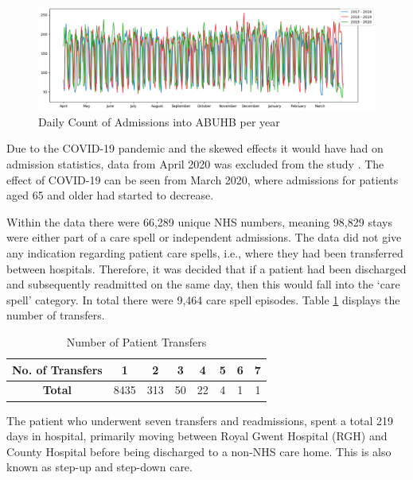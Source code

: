 \documentclass[../thesis.tex]{subfiles}
\begin{document}
\begin{figure}[h!]
    \centering
    \includegraphics[width=\textwidth]{Chapters/Chapter5/Figures/Admission each year.png}
    \caption{Daily Count of Admissions into ABUHB per year}
    \label{fig:AdmissionCount}
\end{figure}

Due to the COVID-19 pandemic and the skewed effects it would have had on admission statistics, data from April 2020 was excluded from the study \cite{Venkatesan2020}. The effect of COVID-19 can be seen from March 2020, where admissions for patients aged 65 and older had started to decrease.

Within the data there were 66,289 unique NHS numbers, meaning 98,829 stays were either part of a care spell or independent admissions. The data did not give any indication regarding patient care spells, i.e., where they had been transferred between hospitals. Therefore, it was decided that if a patient had been discharged and subsequently readmitted on the same day, then this would fall into the `care spell’ category. In total there were 9,464 care spell episodes. Table \ref{Tab:Spell} displays the number of transfers.

\begin{table}[h!]
    \centering
    \begin{tabular}{cccccccc}\toprule
    \textbf{No. of Transfers} & \textbf{1} & \textbf{2} & \textbf{3} & \textbf{4} & \textbf{5} & \textbf{6} & \textbf{7}   \\ \midrule
\textbf{Total} & 8435 & 313 & 50 & 22 & 4 & 1& 1\\ \bottomrule
    \end{tabular}
    \caption{Number of Patient Transfers}
    \label{Tab:Spell}
\end{table}

The patient who underwent seven transfers and readmissions, spent a total 219 days in hospital, primarily moving between Royal Gwent Hospital (RGH) and County Hospital before being discharged to a non-NHS care home. This is also known as step-up and step-down care.
\end{document}
